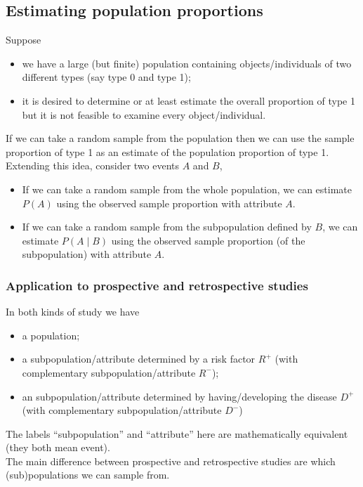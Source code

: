 \documentclass[a4paper]{article}\usepackage[]{graphicx}\usepackage[]{xcolor}
\begin{document}
\subsection{Estimating population proportions}
Suppose
\begin{itemize}
	\item we have a large (but finite) population containing objects/individuals of two different types (say type 0 and type 1);
	\item it is desired to determine or at least estimate the overall proportion of type 1 but it is not feasible to examine every object/individual.
\end{itemize}
If we can take a random sample from the population then we can use the sample proportion of type 1 as an estimate of the population proportion of type 1.\\
Extending this idea, consider two events \( A \) and \( B \),
\begin{itemize}
	\item If we can take a random sample from the whole population, we can estimate \( P(A) \) using the observed sample proportion with attribute \( A \).
	\item If we can take a random sample from the subpopulation defined by \( B \), we can estimate \( P(A \mid B) \) using the observed sample proportion (of the subpopulation) with attribute \( A \).
\end{itemize}
\subsubsection{Application to prospective and retrospective studies}
In both kinds of study we have
\begin{itemize}
	\item a population;
	\item a subpopulation/attribute determined by a risk factor \( R^+ \) (with complementary subpopulation/attribute \( R^- \));
	\item an subpopulation/attribute determined by having/developing the disease \( D^+ \) (with complementary subpopulation/attribute \( D^- \))
\end{itemize}
The labels ``subpopulation'' and ``attribute'' here are mathematically equivalent (they both mean event).\\
The main difference between prospective and retrospective studies are which (sub)populations we can sample from.
\end{document}
